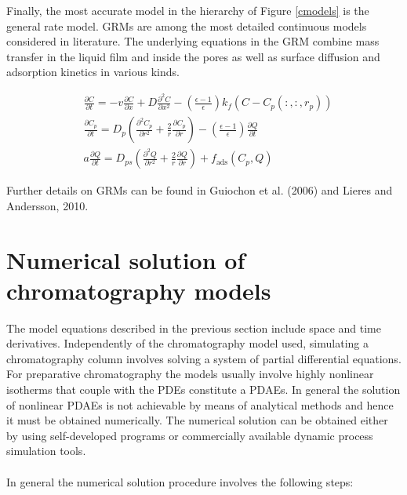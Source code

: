 \documentclass[paper=a4, fontsize=11pt]{scrartcl}
\begin{document}
Finally, the most accurate model in the hierarchy of Figure \ref{cmodels} is the general rate model. GRMs are among the most detailed continuous models considered in literature. The underlying equations in the GRM combine
mass transfer in the liquid film and inside the pores as well as surface diffusion and adsorption kinetics in various kinds. 

\begin{align}
& \frac{\partial C}{\partial t} = -v\frac{\partial C}{\partial x} + D\frac{\partial^2C}{\partial x^2} -  \left(\frac{\epsilon-1}{\epsilon}\right) k_f(C-C_p(:,:,r_p))\\
& \frac{\partial C_p}{\partial t} = D_p\left(\frac{\partial^2C_p}{\partial r^2} + \frac{2}{r} \frac{\partial C_p}{\partial r}\right) -  \left(\frac{\epsilon-1}{\epsilon}\right)\frac{\partial Q}{\partial t}\\
& a \frac{\partial Q}{\partial t} = D_{ps}\left(\frac{\partial^2Q}{\partial r^2} + \frac{2}{r} \frac{\partial Q}{\partial r}\right) + f_{\text{ads}}(C_p,Q)
\end{align}

Further details on GRMs can be found in Guiochon et al. (2006) and Lieres and Andersson, 2010.

\section{Numerical solution of chromatography models}

The model equations described in the previous section include space and time derivatives. Independently of the chromatography model used, simulating a chromatography column involves solving a system of partial differential equations. For preparative chromatography the models usually involve highly nonlinear isotherms that couple with the PDEs constitute a PDAEs. In general the solution of nonlinear PDAEs is not achievable by means of analytical methods and hence it must be obtained numerically. The numerical solution can be obtained either by using self-developed programs or commercially available dynamic process simulation tools.
\\
\\
In general the numerical solution procedure involves the following
steps:
\end{document}
